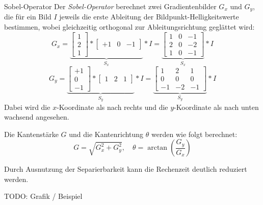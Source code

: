 \begin{defi}[Kantendetektor]{Sobel-Operator}
    Der \emph{Sobel-Operator} berechnet zwei Gradientenbilder $G_x$ und $G_y$, die für ein Bild $I$ jeweils die erste Ableitung der Bildpunkt-Helligkeitswerte bestimmen, wobei gleichzeitig orthogonal zur Ableitungsrichtung geglättet wird:
    \[
        G_x =
        \underbrace{
            \begin{bmatrix}
                1 \\
                2 \\
                1
            \end{bmatrix}
            \ast
            \begin{bmatrix}
                +1 & 0 & -1
            \end{bmatrix}
        }_{S_x}
        \ast I =
        \underbrace{
            \begin{bmatrix}
                1 & 0 & -1 \\
                2 & 0 & -2 \\
                1 & 0 & -1
            \end{bmatrix}
        }_{S_x}
        \ast I
    \]
    \[
        G_y =
        \underbrace{
            \begin{bmatrix}
                +1 \\
                0  \\
                -1
            \end{bmatrix}
            \ast
            \begin{bmatrix}
                1 & 2 & 1
            \end{bmatrix}
        }_{S_y}
        \ast I =
        \underbrace{
            \begin{bmatrix}
                1  & 2  & 1  \\
                0  & 0  & 0  \\
                -1 & -2 & -1
            \end{bmatrix}
        }_{S_y}
        \ast I
    \]
    Dabei wird die $x$-Koordinate als nach rechts und die $y$-Koordinate als nach unten wachsend angesehen.

    Die Kantenstärke $G$ und die Kantenrichtung $\theta$ werden wie folgt berechnet:
    \[
        G = \sqrt{G_x^2 + G_y^2}, \quad \theta = \arctan \left( \frac{G_y}{G_x} \right)
    \]


    Durch Ausnutzung der Separierbarkeit kann die Rechenzeit deutlich reduziert werden.

    TODO: Grafik / Beispiel
\end{defi}

